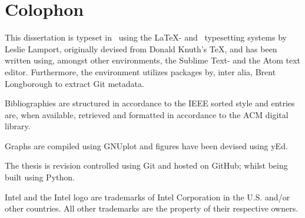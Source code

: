 
\chapter*{Colophon}
\label{cha:colophon}
This dissertation is typeset in \fonttostring\ using the \LaTeX - and \BibTeX\ typesetting systems by Leslie Lamport, originally devised from Donald Knuth's \TeX , and has been written using, amongst other environments, the Sublime Text- and the Atom text editor.
Furthermore, the environment utilizes packages by, inter alia, Brent Longborough to extract Git metadata.

Bibliographies are structured in accordance to the IEEE sorted style and entries are, when available, retrieved and formatted in accordance to the ACM digital library.

Graphs are compiled using GNUplot and figures have been devised using yEd.

The thesis is revision controlled using Git and hosted on GitHub; whilst being built using Python.

Intel and the Intel logo are trademarks of Intel Corporation in the U.S. and/or other countries.
All other trademarks are the property of their respective owners.






